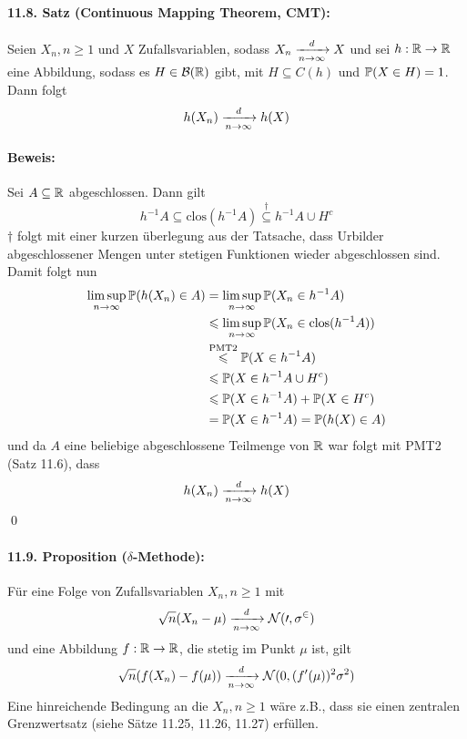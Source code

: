 \documentclass[11pt]{report}
\begin{document}
\paragraph{11.8. Satz (Continuous Mapping Theorem, CMT):} Seien $X_n,n\geq 1$ und $X$ Zufallsvariablen, sodass $X_n\nto{d}{n\to\infty}X$ und sei $h:\mathbb{R}\to\mathbb{R}$ eine Abbildung, sodass es $H\in\mathcal{B}(\mathbb{R})$ gibt, mit $H\subseteq C(h)$ und $\mathbb{P}(X\in H)=1$. Dann folgt
$$h(X_n)\nto{d}{n\to\infty}h(X)$$

\paragraph{Beweis:} Sei $A\subseteq\mathbb{R}$ abgeschlossen. Dann gilt
$$h^{-1}A\subseteq\text{clos}(h^{-1}A)\overset{\dag}{\subseteq}h^{-1}A\cup H^c$$
$\dag$ folgt mit einer kurzen \"uberlegung aus der Tatsache, dass Urbilder abgeschlossener Mengen unter stetigen Funktionen wieder abgeschlossen sind. \newline\newline
Damit folgt nun
\begin{align*}
    \limsup_{n\to\infty}\mathbb{P}(h(X_n)\in A)&=\limsup_{n\to\infty}\mathbb{P}(X_n\in h^{-1}A)\\
    &\leqslant \limsup_{n\to\infty}\mathbb{P}(X_n\in\text{clos}(h^{-1}A))\\
    &\overset{\text{PMT2}}{\leqslant}\mathbb{P}(X\in h^{-1}A) \\
    &\leqslant\mathbb{P}(X\in h^{-1}A\cup H^c)\\
    &\leqslant\mathbb{P}(X\in h^{-1}A)+\mathbb{P}(X\in H^c)\\
    &=\mathbb{P}(X\in h^{-1}A)=\mathbb{P}(h(X)\in A)
\end{align*}
und da $A$ eine beliebige abgeschlossene Teilmenge von $\mathbb{R}$ war folgt mit PMT2 (Satz 11.6), dass
$$h(X_n)\nto{d}{n\to\infty}h(X)$$
\qed

\paragraph{11.9. Proposition ($\delta$-Methode):} F\"ur eine Folge von Zufallsvariablen $X_n,n\geq1$ mit $$\sqrt{n}(X_n-\mu)\nto{d}{n\to\infty}\mathcal{N(0,\sigma^2)}$$
und eine Abbildung $f:\mathbb{R}\to\mathbb{R}$, die stetig im Punkt $\mu$ ist, gilt
$$\sqrt{n}(f(X_n)-f(\mu))\nto{d}{n\to\infty}\mathcal{N}(0,(f'(\mu))^2\sigma^2)$$
Eine hinreichende Bedingung an die $X_n,n\geq1$ w\"are z.B., dass sie einen zentralen Grenzwertsatz (siehe S\"atze 11.25, 11.26, 11.27) erf\"ullen.
\end{document}
